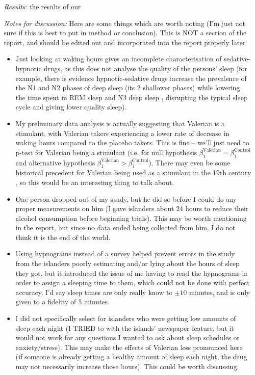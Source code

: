 \documentclass[10pt,preprintnumbers,amsmath,amssymb,floatfix,twocolumn,prl]{revtex4-2}
\begin{document}
\textit{Results}: the results of our

\textit{Notes for discussion:} 
Here are some things which are worth noting (I'm just not sure if this is best to put in method or conclusion). This is NOT a section of the report, and should be edited out and incorporated into the report properly later
\begin{itemize}
\item Just looking at waking hours gives an incomplete characterisation of sedative-hypnotic drugs, as this does not analyse the quality of the persons' sleep (for example, there is evidence hypnotic-sedative drugs increase the prevalence of the N1 and N2 phases of deep sleep (its 2 shallower phases) while lowering the time spent in REM sleep and N3 deep sleep \cite{SleepCyclesSource}, disrupting the typical sleep cycle and giving lower quality sleep).

\item My preliminary data analysis is actually suggesting that Valerian is a stimulant, with Valerian takers experiencing a lower rate of decrease in waking hours compared to the placebo takers. This is fine -- we'll just need to p-test for Valerian being a stimulant (i.e. for null hypothesis $\beta_1^\text{Valerian} = \beta_1^\text{Control}$ and alternative hypothesis $\beta_1^\text{Valerian} > \beta_1^\text{Control}$). There may even be some historical precedent for Valerian being used as a stimulant in the 19th century \cite{ValerianSource2}, so this would be an interesting thing to talk about.

\item One person dropped out of my study, but he did so before I could do any proper measurements on him (I gave islanders about 24 hours to reduce their alcohol consumption before beginning trials). This may be worth mentioning in the report, but since no data ended being collected from him, I do not think it is the end of the world.

\item Using hypnograms instead of a survey helped prevent errors in the study from the islanders poorly estimating and/or lying about the hours of sleep they got, but it introduced the issue of me having to read the hypnograms in order to assign a sleeping time to them, which could not be done with perfect accuracy. I'd say sleep times are only really know to $\pm 10$ minutes, and is only given to a fidelity of 5 minutes.

\item I did not specifically select for islanders who were getting low amounts of sleep each night (I TRIED to with the islands' newspaper feature, but it would not work for any questions I wanted to ask about sleep schedules or anxiety/stress). This may make the effects of Valerian less pronounced here (if someone is already getting a healthy amount of sleep each night, the drug may not necessarily increase those hours). This could be worth discussing.
\end{itemize}



\end{document}
